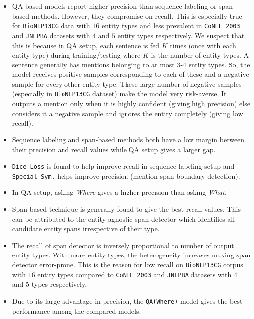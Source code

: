 \begin{itemize}
    \item QA-based models report higher precision than sequence labeling or span-based methods. However, they compromise on recall. This is especially true for \texttt{BioNLP13CG} data with $16$ entity types and less prevalent in \texttt{CoNLL 2003} and \texttt{JNLPBA} datasets with $4$ and $5$ entity types respectively. We suspect that this is because in QA setup, each sentence is fed $K$ times (once with each entity type) during training/testing where $K$ is the number of entity types. A sentence generally has mentions belonging to at most 3-4 entity types. So, the model receives positive samples corresponding to each of these and a negative sample for every other entity type. These large number of negative samples (especially in \texttt{BioNLP13CG} dataset) make the model very risk-averse. It outputs a mention only when it is highly confident (giving high precision) else considers it a negative sample and ignores the entity completely (giving low recall).
    
    \item Sequence labeling and span-based methods both have a low margin between their precision and recall values while QA setup gives a larger gap. 
    
    \item \texttt{Dice Loss} is found to help improve recall in sequence labeling setup and \texttt{Special Sym.} helps improve precision (mention span boundary detection).
    
    \item In QA setup, asking \textit{Where} gives a higher precision than asking \textit{What}.
    
    \item Span-based technique is generally found to give the best recall values. This can be attributed to the entity-agnostic span detector which identifies all candidate entity spans irrespective of their type.
    
    \item The recall of span detector is inversely proportional to number of output entity types. With more entity types, the heterogeneity increases making span detector error-prone. This is the reason for low recall on \texttt{BioNLP13CG} corpus with $16$ entity types compared to \texttt{CoNLL 2003} and \texttt{JNLPBA} datasets with $4$ and $5$ types respectively.
    
    \item Due to its large advantage in precision, the \texttt{QA(Where)} model gives the best performance among the compared models.
\end{itemize}

